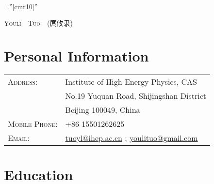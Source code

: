 \documentclass[a4paper,12pt]{article}
\begin{document}
\pagestyle{empty} %

\font\fb=''[cmr10]'' %

\par{\centering
		{\Huge \textsc{Youli}~~\textsc{Tuo}~~\textsc{(庹攸隶)}\\
	}\bigskip \par}

\section{\textbf{Personal Information}}

\begin{tabular}{ll}
  \\
    \textsc{Address:}   & Institute of High Energy Physics, CAS \\
                                  &No.19 Yuquan Road, Shijingshan District\\
                                  &Beijing 100049, China \\
    \textsc{Mobile Phone:}     & +86 15501262625\\
    \textsc{Email:} & \href{mailto:tuoyl@ihep.ac.cn}{tuoyl@ihep.ac.cn} ; \href{mailto:youlituo@gmail.com}{youlituo@gmail.com}
\end{tabular}
 \linebreak

\section{\textbf{Education}}
\end{document}
